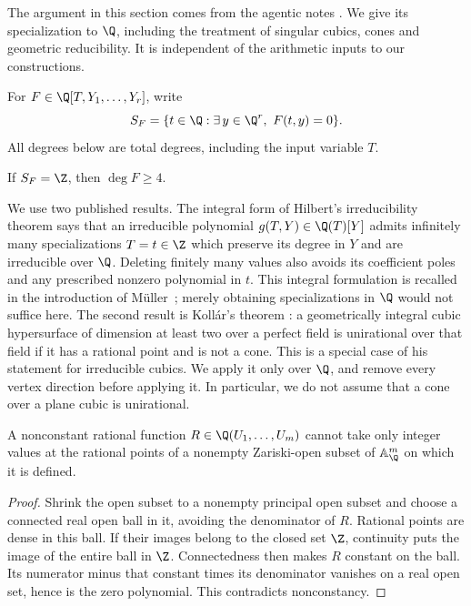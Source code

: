 The argument in this section comes from the agentic notes
\cite[section on unconditional lower bounds]{agentic-improvements}.
We give its specialization to $\Q$, including the treatment of singular
cubics, cones and geometric reducibility.  It is independent of the
arithmetic inputs to our constructions.

For $F\in\Q[T,Y_1,\ldots,Y_r]$, write
\[
 S_F=\{t\in\Q:\exists\,y\in\Q^r,\ F(t,y)=0\}.
\]
All degrees below are total degrees, including the input variable $T$.

\begin{theorem}
\label{thm:degree-four-necessary}
If $S_F=\Z$, then $\deg F\geq4$.
\end{theorem}

We use two published results.  The integral form of Hilbert's
irreducibility theorem says that an irreducible polynomial
$g(T,Y)\in\Q(T)[Y]$ admits infinitely many specializations $T=t\in\Z$
which preserve its degree in $Y$ and are irreducible over $\Q$.
Deleting finitely many values also avoids its coefficient poles and
any prescribed nonzero polynomial in $t$.
This integral formulation is recalled in the introduction of
M\"uller~\cite{Muller2002HIT}; merely obtaining specializations in
$\Q$ would not suffice here.
The second result is Koll\'ar's theorem
\cite[Theorem~2]{Kollar2002Cubic}: a geometrically integral cubic
hypersurface of dimension at least two over a perfect field is
unirational over that field if it has a rational point and is not a cone.
This is a special case of his statement for irreducible cubics.
We apply it only over $\Q$, and remove every vertex direction before
applying it.  In particular, we do not assume that a cone over a plane
cubic is unirational.

\begin{lemma}\label{lem:nonconstant-rational-not-integral}
A nonconstant rational function $R\in\Q(U_1,\ldots,U_m)$ cannot take
only integer values at the rational points of a nonempty Zariski-open
subset of $\mathbb A^m_{\Q}$ on which it is defined.
\end{lemma}
\begin{proof}
Shrink the open subset to a nonempty principal open subset and choose
a connected real open ball in it, avoiding the denominator of $R$.
Rational points are dense in this ball.  If their images belong to the
closed set $\Z$, continuity puts the image of the entire ball in $\Z$.
Connectedness then makes $R$ constant on the ball.  Its numerator minus
that constant times its denominator vanishes on a real open set, hence
is the zero polynomial.  This contradicts nonconstancy.
\end{proof}

